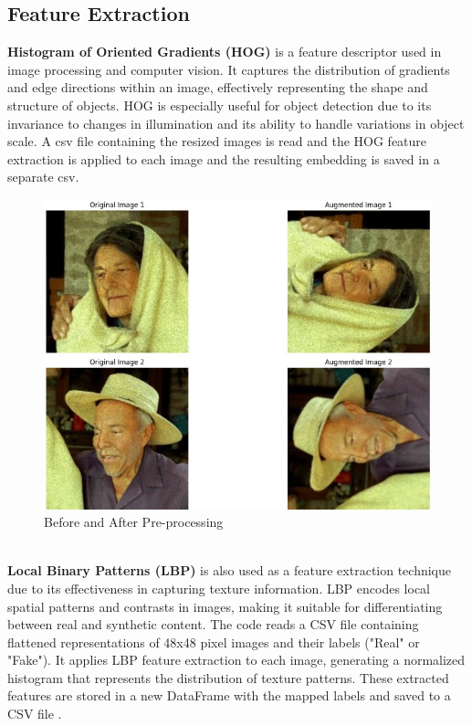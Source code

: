 \documentclass[10pt,twocolumn,letterpaper]{article}
\begin{document}
\subsection{Feature Extraction}
\textbf{Histogram of Oriented Gradients (HOG)} is a feature descriptor used in image processing and computer vision. It captures the distribution of gradients and edge directions within an image, effectively representing the shape and structure of objects. HOG is especially useful for object detection due to its invariance to changes in illumination and its ability to handle variations in object scale. 
A csv file containing the resized images is read and the HOG feature extraction is applied to each image and the resulting embedding is saved in a separate csv.
\begin{figure}[h]
    \centering
    \includegraphics[scale=0.35]{xd.jpg}
    \caption{Before and After Pre-processing}
\end{figure}\\
\textbf{Local Binary Patterns (LBP)} is also used as a feature extraction technique due to its effectiveness in capturing texture information. LBP encodes local spatial patterns and contrasts in images, making it suitable for differentiating between real and synthetic content. The code reads a CSV file containing flattened representations of 48x48 pixel images and their labels ("Real" or "Fake"). It applies LBP feature extraction to each image, generating a normalized histogram that represents the distribution of texture patterns. These extracted features are stored in a new DataFrame with the mapped labels and saved to a CSV file .
\end{document}
